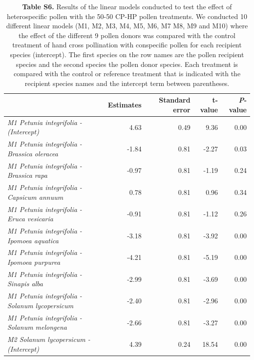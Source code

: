 \documentclass[
  12pt,
]{article}
\begin{document}
\clearpage

\begingroup\fontsize{7}{9}\selectfont

\begin{longtable}[t]{>{\em}lrrrr}
\caption{\label{tab:unnamed-chunk-6}\textbf{Table S6.} Results of the linear models conducted to test the effect of heterospecific pollen with the 50-50 CP-HP pollen treatments. We conducted 10 different linear models (M1, M2, M3, M4, M5, M6, M7 M8, M9 and M10) where the effect of the different 9 pollen donors was compared with the control treatment of hand cross pollination with conspecific pollen for each recipient species (intercept). The first species on the row names are the pollen recipient species and the second species the pollen donor species. Each treatment is compared with the control or reference treatment that is indicated with the recipient species names and the intercept term between parentheses.}\\
\toprule
\textbf{ } & \textbf{Estimates} & \textbf{Standard error} & \textbf{t-value} & \textbf{{\textit{P}}-value}\\
\midrule
\rowcolor{gray!6}  M1 Petunia integrifolia - (Intercept) & 4.63 & 0.49 & 9.36 & 0.00\\
\addlinespace
M1 Petunia integrifolia - Brassica oleracea & -1.84 & 0.81 & -2.27 & 0.03\\
\addlinespace
\rowcolor{gray!6}  M1 Petunia integrifolia - Brassica rapa & -0.97 & 0.81 & -1.19 & 0.24\\
\addlinespace
M1 Petunia integrifolia - Capsicum annuum & 0.78 & 0.81 & 0.96 & 0.34\\
\addlinespace
\rowcolor{gray!6}  M1 Petunia integrifolia - Eruca vesicaria & -0.91 & 0.81 & -1.12 & 0.26\\
\addlinespace
M1 Petunia integrifolia - Ipomoea aquatica & -3.18 & 0.81 & -3.92 & 0.00\\
\addlinespace
\rowcolor{gray!6}  M1 Petunia integrifolia - Ipomoea purpurea & -4.21 & 0.81 & -5.19 & 0.00\\
\addlinespace
M1 Petunia integrifolia - Sinapis alba & -2.99 & 0.81 & -3.69 & 0.00\\
\addlinespace
\rowcolor{gray!6}  M1 Petunia integrifolia - Solanum lycopersicum & -2.40 & 0.81 & -2.96 & 0.00\\
\addlinespace
M1 Petunia integrifolia - Solanum melongena & -2.66 & 0.81 & -3.27 & 0.00\\
\addlinespace
\rowcolor{gray!6}  M2 Solanum lycopersicum - (Intercept) & 4.39 & 0.24 & 18.54 & 0.00\\

\end{longtable}
\end{document}
